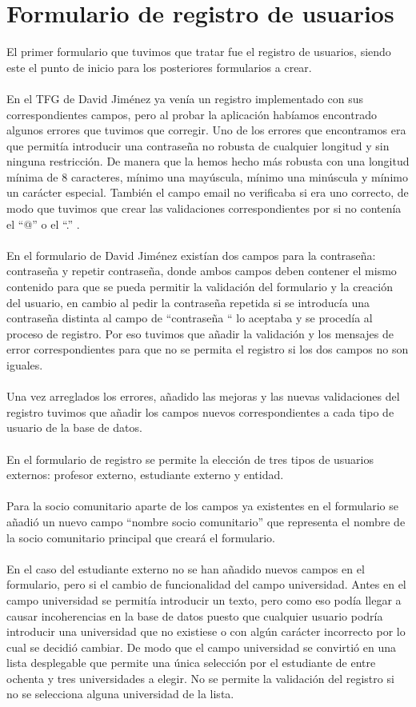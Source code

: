 \documentclass[11pt]{book}
\begin{document}
\section{Formulario de registro de usuarios}
El primer formulario que tuvimos que tratar fue el registro de usuarios, siendo este el punto de inicio para los posteriores formularios a crear.\\\\
En el TFG de David Jiménez ya venía un registro implementado con sus correspondientes campos, pero al probar la aplicación habíamos encontrado algunos errores que tuvimos que corregir. Uno de los errores que encontramos era que permitía introducir una contraseña no robusta de cualquier longitud y sin ninguna restricción. De manera que la hemos hecho más robusta con una longitud mínima de 8 caracteres, mínimo una mayúscula, mínimo una minúscula y mínimo un carácter especial. También el campo email no verificaba si era uno  correcto, de modo que tuvimos que crear las validaciones correspondientes por si no contenía el “@” o el “.” .\\\\
En el formulario de David Jiménez existían dos campos para la contraseña: contraseña y repetir contraseña, donde ambos campos deben contener el mismo contenido para que se pueda permitir la validación del formulario y la creación del usuario, en cambio al pedir la contraseña repetida si se introducía una contraseña distinta al campo de “contraseña “ lo aceptaba y se procedía al proceso de registro. Por eso tuvimos que añadir la validación y los mensajes de error correspondientes para que no se permita el registro si los dos campos no son iguales.\\\\
Una vez arreglados los errores, añadido las mejoras y las nuevas validaciones del registro tuvimos que añadir los campos nuevos correspondientes a cada tipo de usuario de la base de datos. \\\\
En el formulario de registro se permite la elección de tres tipos de usuarios externos: profesor externo, estudiante externo y entidad.\\\\
Para la socio comunitario aparte de los campos ya existentes en el formulario se añadió un nuevo campo “nombre socio comunitario” que representa el nombre de la socio comunitario principal que creará el formulario.\\\\
En el caso del estudiante externo no se han añadido nuevos campos en el formulario, pero si el cambio de funcionalidad del campo universidad. Antes en el campo universidad se permitía introducir un texto, pero como eso podía llegar a causar incoherencias en la base de datos puesto que cualquier usuario podría introducir una universidad que no existiese o con algún carácter incorrecto por lo cual se decidió cambiar. De modo que el campo universidad se convirtió en una lista desplegable que permite una única selección por el estudiante de entre ochenta y tres universidades a elegir.  No se permite la validación del registro si no se selecciona alguna universidad de la lista. \\\\
\end{document}
